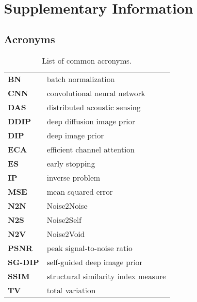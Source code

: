 \chapter{Supplementary Information}

\section{Acronyms}

\begin{table}[h!]
    \centering
    \begin{tabular}{ l l }
        \toprule
        \textbf{BN} & batch normalization \\
        \textbf{CNN} & convolutional neural network \\
        \textbf{DAS} & distributed acoustic sensing \\
        \textbf{DDIP} & deep diffusion image prior \\
        \textbf{DIP} & deep image prior \\
        \textbf{ECA} & efficient channel attention \\
        \textbf{ES} & early stopping \\
        \textbf{IP} & inverse problem \\
        \textbf{MSE} & mean squared error \\
        \textbf{N2N} & Noise2Noise \\
        \textbf{N2S} & Noise2Self \\
        \textbf{N2V} & Noise2Void \\
        \textbf{PSNR} & peak signal-to-noise ratio \\
        \textbf{SG-DIP} & self-guided deep image prior \\
        \textbf{SSIM} & structural similarity index measure \\
        \textbf{TV} & total variation \\
        \bottomrule
    \end{tabular}
    \caption{List of common acronyms.}
\end{table}

